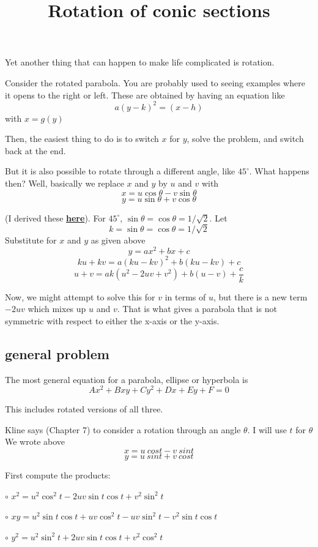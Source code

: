 \documentclass[11pt, oneside]{article}
\title{Rotation of conic sections}
\date{}
\begin{document}
\maketitle
\Large
Yet another thing that can happen to make life complicated is rotation.

Consider the rotated parabola.  You are probably used to seeing examples where it opens to the right or left.  These are obtained by having an equation like
\[ a(y-k)^2 = (x-h)  \]
with $x = g(y)$

Then, the easiest thing to do is to switch $x$ for $y$, solve the problem, and switch back at the end.

But it is also possible to rotate through a different angle, like $45^\circ$.  What happens then?  Well, basically we replace $x$ and $y$ by $u$ and $v$ with
\[ x = u \cos \theta - v \sin \theta \]
\[ y = u \sin \theta + v \cos \theta \]

(I derived these  \hyperref[sec:Geometric_rotation]{\textbf{here}}).
For $45^\circ$, $\sin \theta = \cos \theta = 1/ \sqrt{2}$.
Let
\[ k = \sin \theta = \cos \theta = 1/ \sqrt{2} \]
Substitute for $x$ and $y$ as given above
\[ y = ax^2 + bx + c \]
\[ ku + kv = a(ku - kv)^2 + b(ku - kv) + c \]
\[ u + v = ak(u^2 - 2uv + v^2) + b(u - v) + \frac{c}{k} \]

Now, we might attempt to solve this for $v$ in terms of $u$, but there is a new term $-2uv$ which mixes up $u$ and $v$.  That is what gives a parabola that is not symmetric with respect to either the x-axis or the y-axis.

\subsection*{general problem}
The most general equation for a parabola, ellipse or hyperbola is
\[ Ax^2 + Bxy + Cy^2 + Dx + Ey + F = 0 \]

This includes rotated versions of all three.

Kline says (Chapter 7) to consider a rotation through an angle $\theta$.  I will use $t$ for $\theta$ 
We wrote above
\[ x = u \ cos t - v \ sin t \]
\[ y = u \ sin t + v \ cos t \]

First compute the products: 

$\circ$  $x^2 = u^2 \cos^2 t - 2 uv \sin t \cos t + v^2 \sin^2 t$

$\circ$  $xy = u^2 \sin t \cos t + uv \cos^2 t - uv \sin^2 t - v^2 \sin t \cos t$

$\circ$  $y^2 = u^2 \sin^2 t + 2uv \sin t \cos t + v^2 \cos^2 t$
\end{document}
